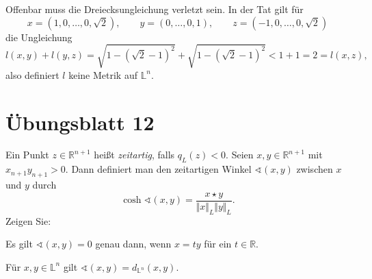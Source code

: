 \documentclass[11pt]{book}
\numberwithin{dummy}{section}
\theoremstyle{nonumberbreak}
\newenvironment{prob}[1][]{\ifthenelse{\equal{#1}{}}{\problem}{\problem[#1]}\rm}{\endproblem}
\newenvironment{sol}[1][]{\ifthenelse{\equal{#1}{}}{\solution}{\solution[#1]}\rm}{\endsolution}
\newcommand{\Loid}{\mathbb{L}}
\newcommand{\R}{\mathbb{R}}
\begin{document}
\begin{spacing}{1.4}
\begin{prob}
\begin{sol}
\begin{compactenum}
\item Offenbar muss die Dreiecksungleichung verletzt sein. In der Tat gilt für 
$$x=(1, 0, \ldots, 0, \sqrt{2}), \qquad y=(0,\ldots, 0, 1), \qquad z=(-1,0,\ldots, 0, \sqrt{2})$$
die Ungleichung
$$l(x,y)+l(y,z) = \sqrt{1-(\sqrt{2}-1)^2} + \sqrt{1-(\sqrt{2}-1)^2} < 1+1=2 = l(x,z),$$
also definiert $l$ keine Metrik auf $\Loid^n$.

\end{compactenum}
\end{sol}

\end{prob}
























\newpage




\titlespacing*{\section}{-16.5pt}{0pt}{20pt}
\renewcommand*\thesection{}
\section{Übungsblatt 12} %
\renewcommand*\thesection{\arabic{section}}






\begin{prob}   %

Ein Punkt $z \in \R^{n+1}$ heißt \textit{zeitartig}, falls $q_L(z)<0$. Seien $x,y \in \R^{n+1}$ mit $x_{n+1}y_{n+1}>0$. Dann definiert man den zeitartigen Winkel $\sphericalangle(x,y)$ zwischen $x$ und $y$ durch 
$$\cosh \sphericalangle(x,y) = \frac{x\star y }{\Vert x\Vert_L \Vert y\Vert_L}.$$
Zeigen Sie:
\begin{compactenum}
\item Es gilt $\sphericalangle(x,y)=0$ genau dann, wenn $x=ty$ für ein $t\in \R$.
\item Für $x,y \in \Loid^{n}$ gilt $\sphericalangle(x,y)= d_{\Loid^n}(x,y)$.
\end{compactenum}


\end{prob}
\end{spacing}
\end{document}
